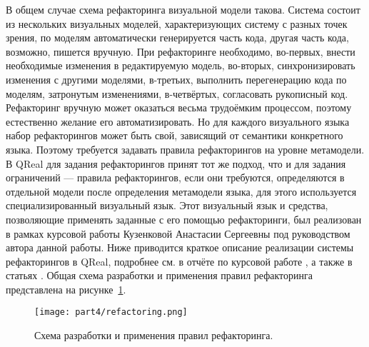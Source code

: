 В общем случае схема рефакторинга визуальной модели такова.
 Система состоит из нескольких визуальных моделей, характеризующих систему с разных точек зрения, по моделям автоматически 
генерируется часть кода, другая часть кода, возможно, пишется вручную. При рефакторинге 
необходимо, во-первых, внести необходимые изменения в редактируемую модель, во-вторых, 
синхронизировать изменения с другими моделями, в-третьих, выполнить перегенерацию кода 
по моделям, затронутым изменениями, в-четвёртых, согласовать рукописный код. Рефакторинг 
вручную может оказаться весьма трудоёмким процессом, поэтому естественно желание его 
автоматизировать. Но для каждого визуального языка набор рефакторингов может быть свой, 
зависящий от семантики конкретного языка. Поэтому требуется задавать правила рефакторингов 
на уровне метамодели. В QReal для задания рефакторингов принят тот же подход, что и 
для задания ограничений --- правила рефакторингов, если они требуются, определяются 
в отдельной модели после определения метамодели языка, для этого используется специализированный 
визуальный язык. Этот визуальный язык и средства, позволяющие применять заданные с его 
помощью рефакторинги, был реализован в рамках курсовой работы Кузенковой Анастасии Сергеевны 
под руководством автора данной работы. Ниже приводится краткое описание реализации 
системы рефакторингов в QReal, подробнее см. в отчёте по курсовой работе
, а также в статьях
. Общая схема разработки и применения правил рефакторинга представлена на рисунке~\ref{image:refactoring}.

\begin{figure} [ht]
	\begin{center}
		\texttt{[image: part4/refactoring.png]}
		\caption{Схема разработки и применения правил рефакторинга.}
		\label{image:refactoring}
	\end{center}
\end{figure}

